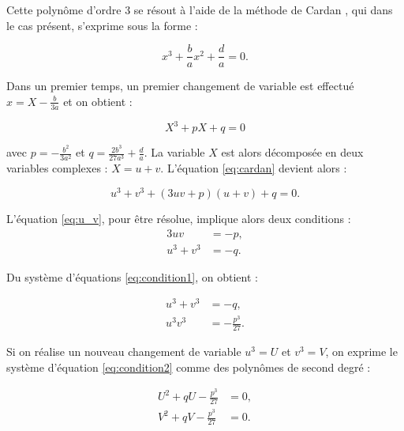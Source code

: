 Cette polynôme d'ordre 3 se résout à l'aide de la méthode de Cardan \cite{nickalls1993new}, qui dans le cas présent, s'exprime sous la forme : 

\begin{equation}
x^3+\frac{b}{a}x^2+\frac{d}{a} = 0.
\end{equation}

Dans un premier temps, un premier changement de variable est effectué $x = X - \frac{b}{3a}$ et on obtient : 

\begin{equation}\label{eq:cardan}
X^3+pX+q = 0
\end{equation}

avec $p = -\frac{b^2}{3a^2}$ et $q = \frac{2b^3}{27a^3}+\frac{d}{a}$. La variable $X$ est alors décomposée en deux variables complexes : $X = u+v$. L'équation \ref{eq:cardan} devient alors : 

\begin{equation}\label{eq:u_v}
u^3+v^3+(3uv+p)(u+v)+q = 0.
\end{equation}

L'équation \ref{eq:u_v}, pour être résolue, implique alors deux conditions  : 
\begin{subequations}\label{eq:condition1}
\begin{align}
3uv &= -p,\\
u^3+v^3 &= -q.
\end{align}
\end{subequations}

Du système d'équations \ref{eq:condition1}, on obtient  : 

\begin{subequations}\label{eq:condition2}
\begin{align}
u^3+v^3 &= -q,\\
u^3v^3 &= -\frac{p^3}{27}.
\end{align}
\end{subequations}

Si on réalise un nouveau changement de variable $u^3 = U$ et $v^3 = V$, on exprime le système d'équation \ref{eq:condition2} comme des polynômes de second degré : 

\begin{subequations}\label{eq:polyUV}
\begin{align}
U^2+qU-\frac{p^3}{27} &= 0,\\
V^2+qV-\frac{p^3}{27} &= 0.
\end{align}
\end{subequations}

